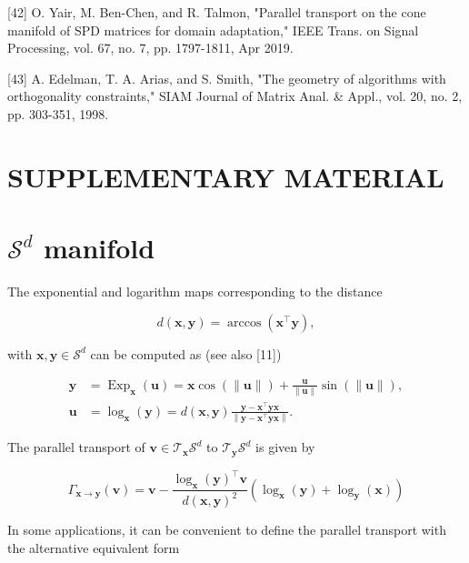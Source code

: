 \documentclass[10pt]{article}
\begin{document}
[42] O. Yair, M. Ben-Chen, and R. Talmon, "Parallel transport on the cone manifold of SPD matrices for domain adaptation," IEEE Trans. on Signal Processing, vol. 67, no. 7, pp. 1797-1811, Apr 2019.

[43] A. Edelman, T. A. Arias, and S. Smith, "The geometry of algorithms with orthogonality constraints," SIAM Journal of Matrix Anal. \& Appl., vol. 20, no. 2, pp. 303-351, 1998.

\section{SUPPLEMENTARY MATERIAL}
\section{$\mathcal{S}^{d}$ manifold}
The exponential and logarithm maps corresponding to the distance

$$
d(\boldsymbol{x}, \boldsymbol{y})=\arccos \left(\boldsymbol{x}^{\top} \boldsymbol{y}\right),
$$

with $\boldsymbol{x}, \boldsymbol{y} \in \mathcal{S}^{d}$ can be computed as (see also [11])

$$
\begin{aligned}
\boldsymbol{y} & =\operatorname{Exp}_{\boldsymbol{x}}(\boldsymbol{u})=\boldsymbol{x} \cos (\|\boldsymbol{u}\|)+\frac{\boldsymbol{u}}{\|\boldsymbol{u}\|} \sin (\|\boldsymbol{u}\|), \\
\boldsymbol{u} & =\log _{\boldsymbol{x}}(\boldsymbol{y})=d(\boldsymbol{x}, \boldsymbol{y}) \frac{\boldsymbol{y}-\boldsymbol{x}^{\top} \boldsymbol{y} \boldsymbol{x}}{\left\|\boldsymbol{y}-\boldsymbol{x}^{\top} \boldsymbol{y} \boldsymbol{x}\right\|} .
\end{aligned}
$$

The parallel transport of $\boldsymbol{v} \in \mathcal{T}_{\boldsymbol{x}} \mathcal{S}^{d}$ to $\mathcal{T}_{\boldsymbol{y}} \mathcal{S}^{d}$ is given by

$$
\Gamma_{\boldsymbol{x} \rightarrow \boldsymbol{y}}(\boldsymbol{v})=\boldsymbol{v}-\frac{\log _{\boldsymbol{x}}(\boldsymbol{y})^{\top} \boldsymbol{v}}{d(\boldsymbol{x}, \boldsymbol{y})^{2}}\left(\log _{\boldsymbol{x}}(\boldsymbol{y})+\log _{\boldsymbol{y}}(\boldsymbol{x})\right)
$$

In some applications, it can be convenient to define the parallel transport with the alternative equivalent form
\end{document}
